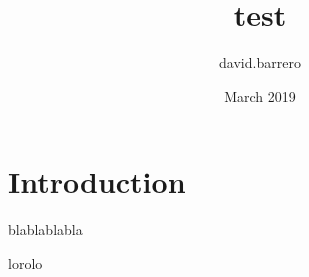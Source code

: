 \documentclass{article}
\title{test}
\author{david.barrero }
\date{March 2019}
\begin{document}
\maketitle

\section{Introduction}
blablablabla

lorolo
\end{document}
